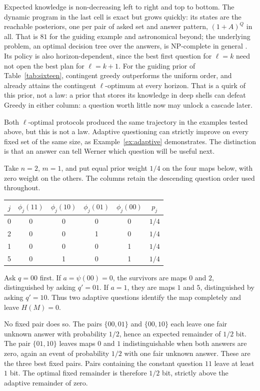 \documentclass[11pt]{article}
\begin{document}
Expected knowledge is non-decreasing left to right and top to bottom. The
dynamic program in the last cell is exact but grows quickly: its
states are the reachable posteriors, one per pair of asked set and
answer pattern, $(1 + A)^{Q}$ in all. That is $81$ for the
guiding example and astronomical beyond; the underlying problem, an
optimal decision tree over the answers, is NP-complete in general
\cite{hyafilrivest76}. Its policy is also
horizon-dependent, since the best first question for $\ell = k$
need not open the best plan for $\ell = k+1$. For
the guiding prior of Table~\ref{tab:sixteen}, contingent greedy outperforms the uniform order, 
and already attains the contingent $\ell$-optimum at every horizon. 
That is a quirk of this prior, not a law: a prior that
stores its knowledge in deep shells can defeat Greedy in either
column: a question worth little now may unlock a cascade
later.

Both $\ell$-optimal protocols produced the same trajectory in the
examples tested above, but this is not a law. Adaptive questioning can
strictly improve on every fixed set of the same size, as Example~\ref{ex:adaptive} demonstrates.
The distinction is that an answer can tell Werner which question
will be useful next.
\begin{example}[label=ex:adaptive]
Take $n=2$, $m=1$, and put equal prior weight $1/4$ on the four
maps below, with zero weight on the others. The columns retain the
descending question order used throughout.
\begin{center}
\begin{tabular}{@{}c cccc c@{}}
\toprule
$j$ & $\phi_j(11)$ & $\phi_j(10)$ & $\phi_j(01)$ & $\phi_j(00)$ & $p_j$\\
\midrule
0 & 0 & 0 & 0 & 0 & $1/4$\\
2 & 0 & 0 & 1 & 0 & $1/4$\\
1 & 0 & 0 & 0 & 1 & $1/4$\\
5 & 0 & 1 & 0 & 1 & $1/4$\\
\bottomrule
\end{tabular}
\end{center}
Ask $q=00$ first. If $a=\psi(00)=0$, the survivors are maps
$0$ and $2$, distinguished by asking $q'=01$. If $a=1$, they are
maps $1$ and $5$, distinguished by asking $q'=10$. Thus two
adaptive questions identify the map completely and leave $H(M)=0$.

No fixed pair does so. The pairs $\{00,01\}$ and $\{00,10\}$ each
leave one fair unknown answer with probability $1/2$, hence an
expected remainder of $1/2$ bit. The pair $\{01,10\}$ leaves maps
$0$ and $1$ indistinguishable when both answers are zero, again an
event of probability $1/2$ with one fair unknown answer. These are
the three best fixed pairs. Pairs containing the constant question
$11$ leave at least $1$ bit. The optimal fixed remainder is therefore
$1/2$ bit, strictly above the adaptive remainder of zero.
\end{example}
\end{document}
